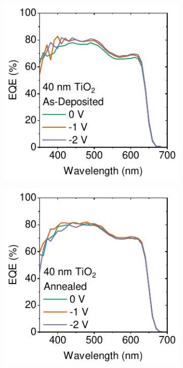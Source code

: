 \begin{figure}[htbp]
    \vspace{1em} %

    \begin{subfigure}[t]{0.45\textwidth}
        \centering
        \includegraphics[width=\textwidth]{chapters/material_properties/images/As_Dep-EQE.pdf} %
        \caption{}
        \label{fig:ch2:as_dep_eqe}
    \end{subfigure}
    \hfill
    \begin{subfigure}[t]{0.45\textwidth}
        \centering
        \includegraphics[width=\textwidth]{chapters/material_properties/images/Annealed_EQE.pdf} %

\end{subfigure}
\end{figure}

